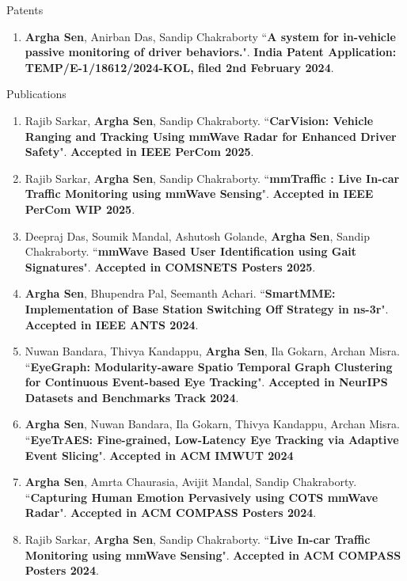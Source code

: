 \documentclass{resume} %
\begin{document}
	\begin{rSection}{Patents}
		\begin{enumerate}
			\item \textbf{Argha Sen}, Anirban Das, Sandip Chakraborty ``\textbf{A system for in-vehicle passive monitoring of driver behaviors.}". \textbf{India Patent Application: TEMP/E-1/18612/2024-KOL, filed 2nd February 2024}.
		\end{enumerate} 
	\end{rSection}
	\newpage
	\begin{rSection}{Publications} 
		\begin{enumerate}
			\small
			\item Rajib Sarkar, \textbf{Argha Sen}, Sandip Chakraborty.	``\textbf{CarVision: Vehicle Ranging and Tracking Using mmWave Radar for Enhanced Driver Safety}". \textbf{Accepted in IEEE PerCom 2025}.
			\item Rajib Sarkar, \textbf{Argha Sen}, Sandip Chakraborty.	``\textbf{mmTraffic : Live In-car Traffic Monitoring using mmWave Sensing}". \textbf{Accepted in IEEE PerCom WIP 2025}.
			\item Deepraj Das, Soumik Mandal, Ashutosh Golande, \textbf{Argha Sen}, Sandip Chakraborty. 
			``\textbf{mmWave Based User Identification using Gait Signatures}". \textbf{Accepted in COMSNETS Posters 2025}.
			\item \textbf{Argha Sen}, Bhupendra Pal, Seemanth Achari. 
			``\textbf{SmartMME: Implementation of Base Station Switching Off Strategy in ns-3r}". \textbf{Accepted in IEEE ANTS 2024}.
			
			\item Nuwan Bandara, Thivya Kandappu, \textbf{Argha Sen}, Ila Gokarn, Archan Misra.
			``\textbf{EyeGraph: Modularity-aware Spatio Temporal Graph Clustering for Continuous Event-based Eye Tracking}".
			\textbf{Accepted in NeurIPS Datasets and Benchmarks Track 2024}.
			
			\item \textbf{Argha Sen}, Nuwan Bandara, Ila Gokarn, Thivya Kandappu, Archan Misra.
			``\textbf{EyeTrAES: Fine-grained, Low-Latency Eye Tracking via Adaptive Event Slicing}".
			\textbf{Accepted in ACM IMWUT 2024}

			\item \textbf{Argha Sen}, Amrta Chaurasia, Avijit Mandal, Sandip Chakraborty. ``\textbf{Capturing Human Emotion Pervasively using COTS mmWave Radar}". \textbf{Accepted in ACM COMPASS Posters 2024}.
			
			\item Rajib Sarkar, \textbf{Argha Sen}, Sandip Chakraborty. ``\textbf{Live In-car Traffic Monitoring using mmWave Sensing}". \textbf{Accepted in ACM COMPASS Posters 2024}.
			

\end{enumerate}
\end{rSection}
\end{document}
